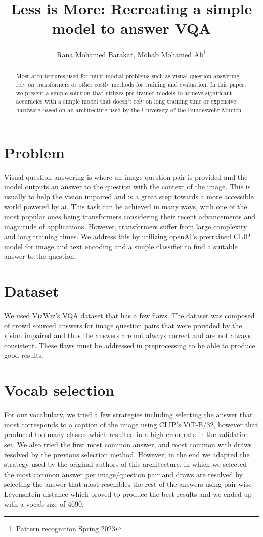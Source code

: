 \documentclass[12pt]{IEEEtran}
\begin{document}
\title{Less is More: Recreating a simple model to answer VQA}
\author{Rana Mohamed Barakat, Mohab Mohamed Ali\thanks{Pattern recognition Spring 2023}}
\maketitle

\begin{abstract}
Most architectures used for multi modial problems such as visual question answering rely on transformers or other costly methods for training and evaluation. In this paper, we present a simple solution that utilizes pre trained models to achieve significant accuracies with a simple model that doesn’t rely on long training time or expensive hardware based on an architecture used by the University of the Bundeswehr Munich\cite{deuser2022less}.
\end{abstract}

\section{Problem}
Visual question answering is where an image question pair is provided and the model outputs an answer to the question with the context of the image. This is usually to help the vision impaired and is a great step towards a more accessible world powered by ai. This task can be achieved in many ways, with one of the most popular ones being transformers considering their recent advancements and magnitude of applications. However, transformers suffer from large complexity and long training times. We address this by utilizing openAI’s pretrained CLIP\cite{radford2021learning} model for image and text encoding and a simple classifier to find a suitable answer to the question.

\section{Dataset}
We used VizWiz’s VQA dataset that has a few flaws. The dataset was composed of crowd sourced answers for image question pairs that were provided by the vision impaired and thus the answers are not always correct and are not always consistent. These flaws must be addressed in preprocessing to be able to produce good results.

\section{Vocab selection}
For our vocabulary, we tried a few strategies including selecting the answer that most corresponds to a caption of the image using CLIP’s ViT-B/32, however that produced too many classes which resulted in a high error rate in the validation set. We also tried the first most common answer, and most common with draws resolved by the previous selection method. However, in the end we adapted the strategy used by the original authors of this architecture, in which we selected the most common answer per image/question pair and draws are resolved by selecting the answer that most resembles the rest of the answers using pair wise Levenshtein distance which proved to produce the best results and we ended up with a vocab size of 4690.
\end{document}
